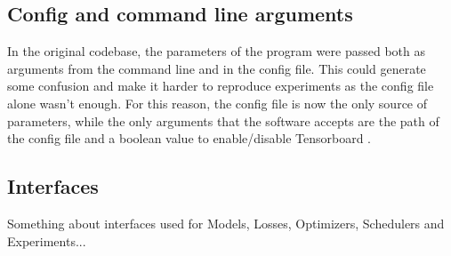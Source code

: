 \subsection{Config and command line arguments}
In the original codebase, the parameters of the program were passed both as
arguments from the command line and in the config file. This could generate some
confusion and make it harder to reproduce experiments as the config file alone
wasn't enough. For this reason, the config file is now the only source of
parameters, while the only arguments that the software accepts are the path of
the config file and a boolean value to enable/disable Tensorboard \cite{abadi2015tensorflow}.










\subsection{Interfaces}
Something about interfaces used for Models, Losses, Optimizers, Schedulers and
Experiments...


